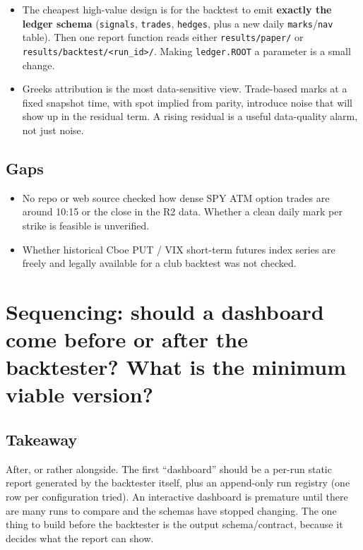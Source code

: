\documentclass{article}
\begin{document}
\begin{itemize}

\item [INFERENCE] The cheapest high-value design is for the backtest to emit \textbf{exactly the ledger schema} (\texttt{signals}, \texttt{trades}, \texttt{hedges}, plus a new daily \texttt{marks}/\allowbreak{}\texttt{nav} table). Then one report function reads either \texttt{results/\allowbreak{}paper/\allowbreak{}} or \texttt{results/\allowbreak{}backtest/\allowbreak{}<run\_\allowbreak{}id>/\allowbreak{}}. Making \texttt{ledger.\allowbreak{}ROOT} a parameter is a small change.

\item [INFERENCE] Greeks attribution is the most data-sensitive view. Trade-based marks at a fixed snapshot time, with spot implied from parity, introduce noise that will show up in the residual term. A rising residual is a useful data-quality alarm, not just noise.

\end{itemize}

\subsection{Gaps}

\begin{itemize}

\item No repo or web source checked how dense SPY ATM option trades are around 10:15 or the close in the R2 data. Whether a clean daily mark per strike is feasible is unverified.

\item Whether historical Cboe PUT /\allowbreak{} VIX short-term futures index series are freely and legally available for a club backtest was not checked.

\end{itemize}

\section{Sequencing: should a dashboard come before or after the backtester? What is the minimum viable version?}

\subsection{Takeaway}

After, or rather alongside. The first ``dashboard'' should be a per-run static report generated by the backtester itself, plus an append-only run registry (one row per configuration tried). An interactive dashboard is premature until there are many runs to compare and the schemas have stopped changing. The one thing to build before the backtester is the output schema/\allowbreak{}contract, because it decides what the report can show.
\end{document}
